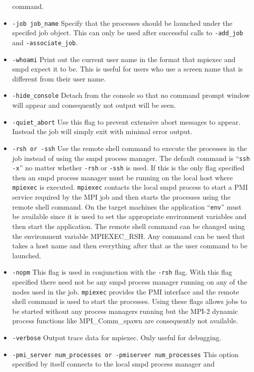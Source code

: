 \documentclass[dvipdfm,11pt]{article}
\begin{document}
\begin{itemize}
command.
\item \texttt{-job job\_name}
Specify that the processes should be launched under the specifed job object.
This can only be used after successful calls to \texttt{-add\_job} and \texttt{-associate\_job}.
\item \texttt{-whoami}
Print out the current user name in the format that mpiexec and smpd expect it to be.
This is useful for users who use a screen name that is different from their user
name.
\item \texttt{-hide\_console}
Detach from the console so that no command prompt window will appear and consequently
not output will be seen.
\item \texttt{-quiet\_abort}
Use this flag to prevent extensive abort messages to appear.  Instead the job 
will simply exit with minimal error output.
\item \texttt{-rsh or -ssh}
Use the remote shell command to execute the processes in the job instead of
using the smpd process manager.  The default command is ``\texttt{ssh -x}'' no
matter whether \texttt{-rsh} or \texttt{-ssh} is used.  If this is the only
flag specified then an smpd process manager must be running on the local host
where \texttt{mpiexec} is executed.  \texttt{mpiexec} contacts the local smpd process to start
a PMI service required by the MPI job and then starts the processes using the 
remote shell command.  On the target machines the application ``\texttt{env}''
must be available since it is used to set the appropriate environment variables
and then start the application.  The remote shell command can be changed using
the environment variable MPIEXEC\_RSH.  Any command can be used that takes a 
host name and then everything after that as the user command to be launched.
\item \texttt{-nopm}
This flag is used in conjunction with the \texttt{-rsh} flag.  With this flag
specified there need not be any smpd process manager running on any of the nodes
used in the job.  \texttt{mpiexec} provides the PMI interface and the remote
shell command is used to start the processes.  Using these flags allows jobs to
be started without any process managers running but the MPI-2 dynamic process
functions like MPI\_Comm\_spawn are consequently not available.
\item \texttt{-verbose}
Output trace data for mpiexec.  Only useful for debugging.
\item \texttt{-pmi\_server num\_processes or -pmiserver num\_processes}
This option specified by itself connects to the local smpd process manager and

\end{itemize}
\end{document}
